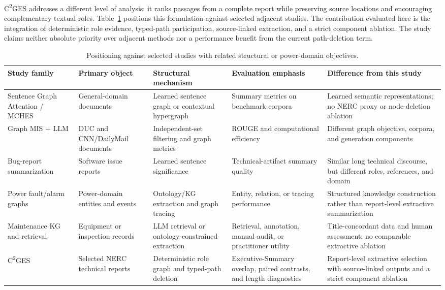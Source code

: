 \documentclass[information,article,submit,moreauthors]{Definitions/mdpi}
\newcommand{\cges}{C\textsuperscript{2}GES}
\begin{document}
\cges{} addresses a different level of analysis: it ranks passages from a complete report while preserving source locations and encouraging complementary textual roles. Table~\ref{tab:related-comparison} positions this formulation against selected adjacent studies. The contribution evaluated here is the integration of deterministic role evidence, typed-path participation, source-linked extraction, and a strict component ablation. The study claims neither absolute priority over adjacent methods nor a performance benefit from the current path-deletion term.

\begin{table}[H]
\caption{Positioning against selected studies with related structural or power-domain objectives.}
\label{tab:related-comparison}\centering\scriptsize
\begin{tabularx}{\textwidth}{p{2.5cm}p{2.4cm}p{2.5cm}p{2.5cm}X}
\toprule
Study family & Primary object & Structural mechanism & Evaluation emphasis & Difference from this study\\
\midrule
Sentence Graph Attention / MCHES \cite{siragusa2022sentencegraph,onan2024mches} & General-domain documents & Learned sentence graph or contextual hypergraph & Summary metrics on benchmark corpora & Learned semantic representations; no NERC proxy or node-deletion ablation\\
Graph MIS + LLM \cite{hark2025mis} & DUC and CNN/DailyMail documents & Independent-set filtering and graph metrics & ROUGE and computational efficiency & Different graph objective, corpora, and generation components\\
Bug-report summarization \cite{koh2022bugreport} & Software issue reports & Learned sentence significance & Technical-artifact summary quality & Similar long technical discourse, but different roles, references, and domain\\
Power fault/alarm graphs \cite{liu2022powerfault,ma2025alarm} & Power-domain entities and events & Ontology/KG extraction and graph tracing & Entity, relation, or tracing performance & Structured knowledge construction rather than report-level extractive summarization\\
Maintenance KG and retrieval \cite{cao2024coalmaintenance,zgg2026bridge} & Equipment or inspection records & LLM retrieval or ontology-constrained extraction & Retrieval, annotation, manual audit, or practitioner utility & Title-concordant data and human assessment; no comparable extractive ablation\\
\cges{} & Selected NERC technical reports & Deterministic role graph and typed-path deletion & Executive-Summary overlap, paired contrasts, and length diagnostics & Report-level extractive selection with source-linked outputs and a strict component ablation\\
\bottomrule
\end{tabularx}
\end{table}
\end{document}
